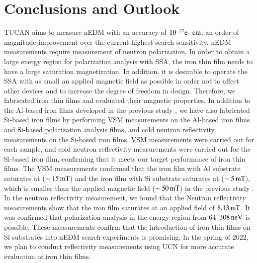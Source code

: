 \documentclass{jps-cp}
\begin{document}
\section{Conclusions and Outlook}
TUCAN aims to measure nEDM with an accuracy of $10^{-27}\rm e\cdot cm$, an order of magnitude improvement over the current highest search sensitivity. nEDM measurements require measurement of neutron polarization. In order to obtain a large energy region for polarization analysis with SSA, the iron thin film needs to have a large saturation magnetization. In addition, it is desirable to operate the SSA with as small an applied magnetic field as possible in order not to affect other devices and to increase the degree of freedom in design. Therefore, we fabricated iron thin films and evaluated their magnetic properties. In addition to the Al-based iron films developed in the previous study \cite{SSA}, we have also fabricated Si-based iron films by performing VSM measurements on the Al-based iron films and Si-based polarization analysis films, and cold neutron reflectivity measurements on the Si-based iron films. VSM measurements were carried out for each sample, and cold neutron reflectivity measurements were carried out for the Si-based iron film, confirming that it meets our target performance of iron thin films.
The VSM measurements confirmed that the iron film with Al substrate saturates at ($\sim 15\rm\,mT$) and the iron film with Si substrate saturates at ($\sim 5\rm\,mT$), which is smaller than the applied magnetic field ($\sim 50\rm\,mT$) in the previous study \cite{SSA}. In the neutron reflectivity measurement, we found that the Neutron reflectivity measurements show that the iron film saturates at an applied field of $8.13\,\rm mT$.
It was confirmed that polarization analysis in the energy region from $64$--$308\,\rm neV$ is possible.
These measurements confirm that the introduction of iron thin films on Si substrates into nEDM search experiments is promising.
In the spring of 2022, we plan to conduct reflectivity measurements using UCN for more accurate evaluation of iron thin films.
\end{document}
